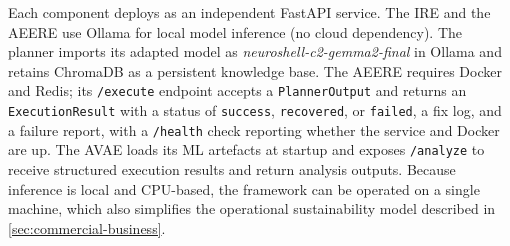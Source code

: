 Each component deploys as an independent FastAPI service. The IRE and the AEERE
use Ollama for local model inference (no cloud dependency). The planner imports
its adapted model as \emph{neuroshell-c2-gemma2-final} in Ollama and retains
ChromaDB as a persistent knowledge base. The AEERE requires Docker and Redis;
its \texttt{/execute} endpoint accepts a \texttt{PlannerOutput} and returns an
\texttt{ExecutionResult} with a status of \texttt{success}, \texttt{recovered},
or \texttt{failed}, a fix log, and a failure report, with a \texttt{/health}
check reporting whether the service and Docker are up. The AVAE loads its ML
artefacts at startup and exposes \texttt{/analyze} to receive structured
execution results and return analysis outputs. Because inference is local and
CPU-based, the framework can be operated on a single machine, which also
simplifies the operational sustainability model described in
\cref{sec:commercial-business}.